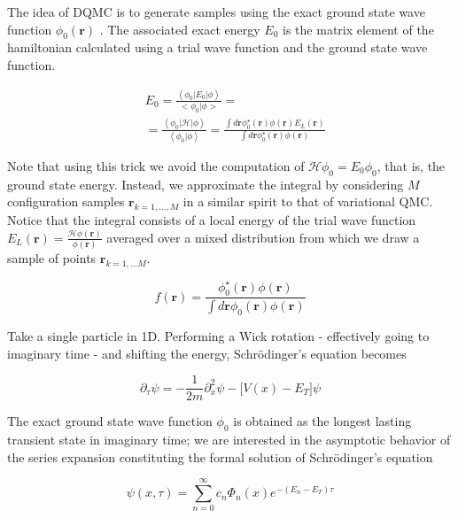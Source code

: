 \documentclass[10pt, twocolumn, twoside]{article}
\begin{document}
The idea of DQMC is to generate samples using the exact ground state wave function $\phi_0 (\bm r)$ \cite{vmc}. The associated exact energy $E_0$ is the matrix element of the hamiltonian calculated using a trial wave function and the ground state wave function.

\begin{equation}
\begin{split}
&E_0 = \frac{ \left\langle \phi_0 | E_0 | \phi \right\rangle}{< \phi_0 | \phi >} = \\
&= \frac{\left\langle \phi_0 | \mathcal{H} | \phi \right\rangle}{ \left\langle\phi_0 | \phi \right\rangle} = \frac{\int d\bm r \phi_0^\star (\bm r) \phi (\bm r) E_L (\bm r)}{\int d\bm r\phi_0^\star (\bm r) \phi (\bm r)}
\end{split}
\end{equation}

Note that using this trick we avoid the computation of $\mathcal{H} \phi_0 = E_0 \phi_0$, that is, the ground state energy. Instead, we approximate the integral by considering $M$ configuration samples $\bm r_{k = 1,..., M}$ in a similar spirit to that of variational QMC. Notice that the integral consists of a local energy of the trial wave function $E_L (\bm r) = \frac{\mathcal{H} \phi (\bm r)}{\phi (\bm r)}$ averaged over a mixed distribution from which we draw a sample of points $\bm r_{k=1,...M}$.

\begin{equation}
f(\bm r) = \frac{\phi_0^\star (\bm r) \phi (\bm r) }{ \int d\bm r  \phi_0 (\bm r) \phi (\bm r)}
\end{equation}

Take a single particle in 1D. Performing a Wick rotation - effectively going to imaginary time - and shifting the energy, Schr\"odinger's equation becomes

\begin{equation}
\partial_\tau \psi = -\frac{1}{2m} \partial^2_x \psi - \bigg[ V(x) - E_T \bigg] \psi
\end{equation}

The exact ground state wave function $\phi_0$ is obtained as the longest lasting transient state in imaginary time; we are interested in the asymptotic behavior of the series expansion constituting the formal solution of Schr\"odinger's equation

\begin{equation}
\psi (x, \tau) = \sum_{n=0}^{\infty} c_n \Phi_n (x) e^{-(E_n - E_T)\tau}
\end{equation}
\end{document}
